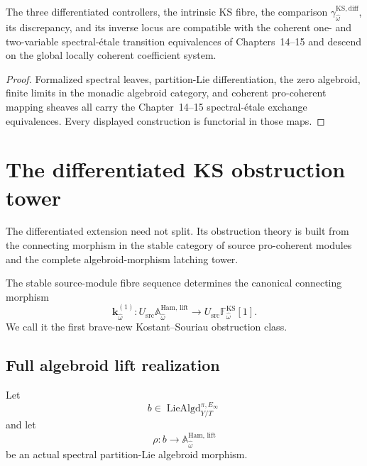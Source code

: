 \begin{proposition}
\label{prop:prequantum-quantomorphism-controller-etale-descent}
The three differentiated controllers, the intrinsic KS fibre, the comparison
$\gamma_{\widehat\omega}^{\mathrm{KS,diff}}$, its discrepancy, and its inverse
locus are compatible with the coherent one- and two-variable spectral-\'etale
transition equivalences of Chapters~14--15 and descend on the global locally
coherent coefficient system.
\end{proposition}

\begin{proof}
Formalized spectral leaves, partition-Lie differentiation, the zero algebroid,
finite limits in the monadic algebroid category, and coherent pro-coherent mapping
sheaves all carry the Chapter~14--15 spectral-\'etale exchange equivalences.
Every displayed construction is functorial in those maps.
\end{proof}

\section{The differentiated KS obstruction tower}
\label{sec:prequantum-differentiated-kostant-souriau}

The differentiated extension need not split.  Its obstruction theory is built
from the connecting morphism in the stable category of source pro-coherent
modules and the complete algebroid-morphism latching tower.

\begin{construction}
\label{constr:prequantum-extension-class}
The stable source-module fibre sequence determines the canonical connecting
morphism
\[
\boxed{
\mathbf k_{\widehat\omega}^{(1)}:
U_{\mathrm{src}}\mathbb A_{\widehat\omega}^{\mathrm{Ham,\,lift}}
\longrightarrow
U_{\mathrm{src}}\mathbb F_{\widehat\omega}^{\mathrm{KS}}[1].
}
\]
We call it the first brave-new Kostant--Souriau obstruction class.
\end{construction}

\subsection{Full algebroid lift realization}
\label{subsec:prequantum-full-algebroid-lift-realization}

Let
\[
b\in\operatorname{LieAlgd}^{\pi,E_\infty}_{Y/T}
\]
and let
\[
\rho:b\longrightarrow
\mathbb A_{\widehat\omega}^{\mathrm{Ham,\,lift}}
\]
be an actual spectral partition-Lie algebroid morphism.

